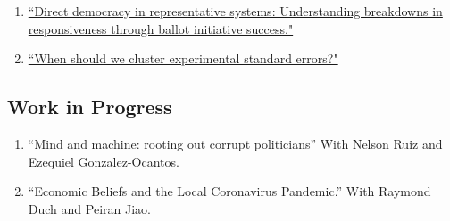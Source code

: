 \documentclass[11pt, a4paper]{article}
\begin{document}
\begin{enumerate}

\item \href{https://ts-robinson.com/publication/robinson-directdemocracyrepresentative-2020/robinson-directdemocracyrepresentative-2020.pdf}{``Direct democracy in representative systems: Understanding breakdowns in responsiveness through ballot initiative success."}


\item \href{https://ts-robinson.com/publication/robinson-whenshouldwe-2020/robinson-whenshouldwe-2020.pdf}{``When should we cluster experimental standard errors?" }

\end{enumerate}

\subsection*{Work in Progress}

\begin{enumerate}

\item ``Mind and machine: rooting out corrupt politicians'' With Nelson Ruiz and Ezequiel Gonzalez-Ocantos.

\item ``Economic Beliefs and the Local Coronavirus Pandemic.'' With Raymond Duch and Peiran Jiao.


\end{enumerate}
\end{document}
